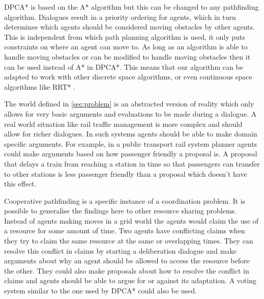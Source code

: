 DPCA* is based on the A* algorithm \cite{hart1968} but this can be changed to
any pathfinding algorithm. Dialogues result in a priority ordering for agents,
which in turn determines which agents should be considered moving obstacles by
other agents. This is independent from which path planning algorithm is used,
it only puts constraints on where an agent can move to. As long as an algorithm
is able to handle moving obstacles or can be modified to handle moving
obstacles then it can be used instead of A* in DPCA*. This means that our
algorithm can be adapted to work with other discrete space algorithms, or even
continuous space algorithms like RRT* \cite{lavalle1998,lavalle2001}.

The world defined in \autoref{sec:problem} is an abstracted version of reality
which only allows for very basic arguments and evaluations to be made during a
dialogue. A real world situation like rail traffic management is more complex
and should allow for richer dialogues. In such systems agents should be able to
make domain specific arguments. For example, in a public transport rail system
planner agents could make arguments based on how passenger friendly a proposal
is. A proposal that delays a train from reaching a station in time so that
passengers can transfer to other stations is less passenger friendly than a
proposal which doesn't have this effect.

Cooperative pathfinding is a specific instance of a coordination problem. It is
possible to generalise the findings here to other resource sharing problems.
Instead of agents making moves in a grid world the agents would claim the use
of a resource for some amount of time. Two agents have conflicting claims when
they try to claim the same resource at the same or overlapping times. They can
resolve this conflict in claims by starting a deliberation dialogue and make
arguments about why an agent should be allowed to access the resource before
the other. They could also make proposals about how to resolve the conflict in
claims and agents should be able to argue for or against its adaptation. A
voting system similar to the one used by DPCA* could also be used.

